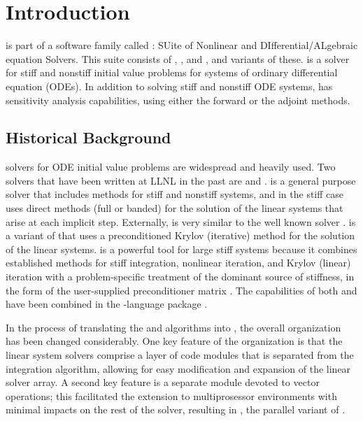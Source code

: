 \section{Introduction}\label{s:intro}

{\cvodes} is part of a software family called {\sundials}: 
SUite of Nonlinear and DIfferential/ALgebraic equation Solvers.  
This suite consists of {\cvode}, {\kinsol}, and {\ida}, and variants of these. 
%
{\cvodes} is a solver for stiff and
nonstiff initial value problems for systems of ordinary differential equation
(ODEs). In addition to solving stiff and nonstiff ODE systems, {\cvodes} has sensitivity 
analysis capabilities, using either the forward or the adjoint methods.

\subsection{Historical Background}\label{ss:history}

{\F} solvers for ODE initial value problems are widespread and heavily used. 
Two solvers that have been written at LLNL in the past are {\vode} \cite{BBH89} 
and {\vodpk} \cite{By92}.
{\vode} is a general purpose solver that includes methods for stiff
and nonstiff systems, and in the stiff case uses direct methods (full or
banded) for the solution of the linear systems that arise at each implicit
step. Externally, {\vode} is very similar to the well known solver
{\lsode} \cite{KH93}.
{\vodpk} is a variant of {\vode} that uses a preconditioned Krylov 
(iterative) method for the solution of the linear systems. {\vodpk} is a powerful 
tool for large stiff systems because it combines established methods for stiff 
integration, nonlinear iteration, and Krylov (linear) iteration with a problem-specific
treatment of the dominant source of stiffness, in the form of the user-supplied
preconditioner matrix \cite{BrHi89}.
The capabilities of both {\vode} and {\vodpk} have been combined in the {\C}-language 
package {\cvode} \cite{CH94, CH96}.

In the process of translating the {\vode} and {\vodpk} algorithms into {\C}, the overall 
{\cvode} organization has been changed considerably.
One key feature of the {\cvode} organization is that the linear system solvers comprise a
layer of code modules that is separated from the integration algorithm, allowing for 
easy modification and expansion of the linear solver array.
A second key feature is a separate module devoted to vector operations; this 
facilitated the extension to multiprosessor environments with minimal impacts 
on the rest of the solver, resulting in {\pvode} \cite{ByH99}, 
the parallel variant of {\cvode}.

